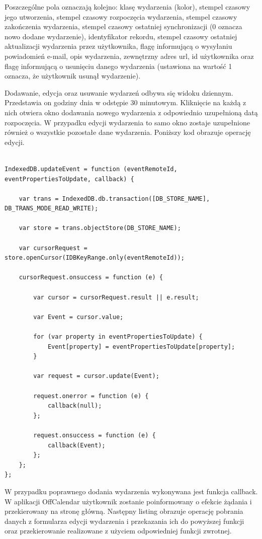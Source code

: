 Poszczególne pola oznaczają kolejno: klasę wydarzenia (kolor), stempel czasowy jego utworzenia, stempel czasowy rozpoczęcia wydarzenia, stempel czasowy zakończenia wydarzenia, stempel czasowy ostatniej synchronizacji (0 oznacza nowo dodane wydarzenie), identyfikator rekordu, stempel czasowy ostatniej aktualizacji wydarzenia przez użytkownika, flagę informującą o wysyłaniu powiadomień \mbox{e-mail}, opis wydarzenia, zewnętrzny adres url, id użytkownika oraz flagę informującą o usunięciu danego wydarzenia (ustawiona na wartość 1 oznacza, że użytkownik usunął wydarzenie).

Dodawanie, edycja oraz usuwanie wydarzeń odbywa się widoku dziennym. Przedstawia on godziny dnia w odstępie 30 minutowym. Kliknięcie na każdą z nich otwiera okno dodawania nowego wydarzenia z odpowiednio uzupełnioną datą rozpoczęcia. W przypadku edycji wydarzenia to samo okno zostaje uzupełnione również o wszystkie pozostałe dane wydarzenia. Poniższy kod obrazuje operację edycji.

\begin{lstlisting}[caption=Edycja wydarzenia cz. 1., label=amb, captionpos=b]

IndexedDB.updateEvent = function (eventRemoteId, eventPropertiesToUpdate, callback) {

    var trans = IndexedDB.db.transaction([DB_STORE_NAME], DB_TRANS_MODE_READ_WRITE);

    var store = trans.objectStore(DB_STORE_NAME);

    var cursorRequest = store.openCursor(IDBKeyRange.only(eventRemoteId));

    cursorRequest.onsuccess = function (e) {

        var cursor = cursorRequest.result || e.result;

        var Event = cursor.value;

        for (var property in eventPropertiesToUpdate) {
            Event[property] = eventPropertiesToUpdate[property];
        }

        var request = cursor.update(Event);

        request.onerror = function (e) {
            callback(null);
        };

        request.onsuccess = function (e) {
            callback(Event);
        };
    };
};

\end{lstlisting}

W przypadku poprawnego dodania wydarzenia wykonywana jest funkcja callback. W aplikacji \mbox{OffCalendar} użytkownik zostanie poinformowany o efekcie żądania i przekierowany na stronę główną. Następny listing obrazuje operację pobrania danych z formularza edycji wydarzenia i przekazania ich do powyższej funkcji oraz przekierowanie realizowane z użyciem odpowiedniej funkcji zwrotnej.


